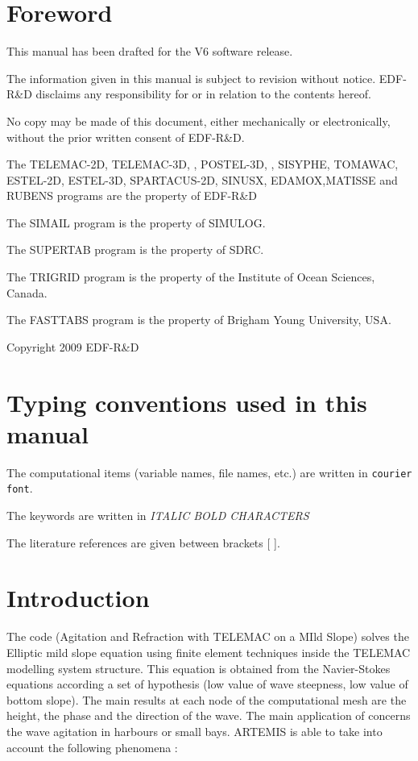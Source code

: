 \chapter{Foreword}

This manual has been drafted for the V6 software release.

The information given in this manual is subject to revision without notice. EDF-R\&D disclaims any responsibility for or in relation to the contents hereof.

No copy may be made of this document, either mechanically or electronically, without the prior written consent of EDF-R\&D.

The TELEMAC-2D, TELEMAC-3D, \artemis{}, POSTEL-3D, \stbtel{}, SISYPHE, TOMAWAC, ESTEL-2D, ESTEL-3D, SPARTACUS-2D, SINUSX, EDAMOX,MATISSE and RUBENS programs are the property of EDF-R\&D

The SIMAIL program is the property of SIMULOG.

The SUPERTAB program is the property of SDRC.

The TRIGRID program is the property of the Institute of Ocean Sciences, Canada.

The FASTTABS program is the property of Brigham Young University, USA.

Copyright 2009 EDF-R\&D

\chapter{Typing conventions used in this manual}


The computational items (variable names, file names, etc.) are written in \verb!courier font!.

The keywords are written in \textit{ITALIC BOLD CHARACTERS}

The literature references are given between brackets [ ].


\chapter{Introduction}

The \artemis{} code (Agitation and Refraction with TELEMAC on a MIld Slope)
solves the Elliptic mild slope equation \cite{berkhoff1976} using finite
element techniques inside the TELEMAC modelling system structure. This equation
is obtained from the Navier-Stokes equations according a set of hypothesis (low
value of wave steepness, low value of bottom slope). The main results at each
node of the computational mesh are the height, the phase and the direction of
the wave. The main application of \artemis{} concerns the wave agitation in
harbours or small bays. ARTEMIS is able to take into account the following
phenomena :

